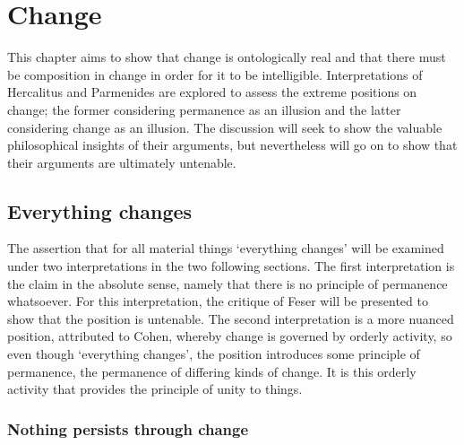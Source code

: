 \chapter{Change}
\label{ch:change}


This chapter aims to show that change is ontologically real and that there must be composition in change in order for it to be intelligible. Interpretations of Hercalitus and Parmenides are explored to assess the extreme positions on change; the former considering permanence as an illusion and the latter considering change as an illusion. The discussion will seek to show the valuable philosophical insights of their arguments, but nevertheless will go on to show that their arguments are ultimately untenable.

\section{Everything changes}

The assertion that for all material things `everything changes' will be examined under two interpretations in the two following sections. The first interpretation is the claim in the absolute sense, namely that there is no principle of permanence whatsoever. For this interpretation, the critique of Feser will be presented to show that the position is untenable. The second interpretation is a more nuanced position, attributed to Cohen, whereby change is governed by orderly activity, so even though `everything changes', the position introduces some principle of permanence, the permanence of differing kinds of change. It is this orderly activity that provides the principle of unity to things.

\subsection{Nothing persists through change}

